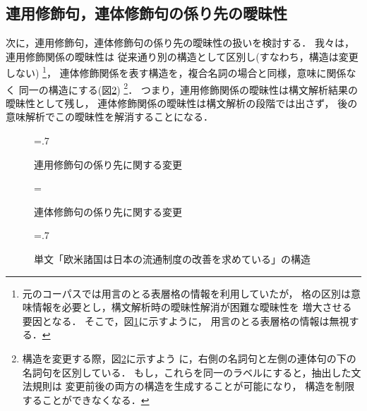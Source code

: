 \subsection{連用修飾句，連体修飾句の係り先の曖昧性}



次に，連用修飾句，連体修飾句の係り先の曖昧性の扱いを検討する．
我々は，連用修飾関係の曖昧性は
従来通り別の構造として区別し(すなわち，構造は変更しない)
\footnote{元のコーパスでは用言のとる表層格の情報を利用していたが，
格の区別は意味情報を必要とし，構文解析時の曖昧性解消が困難な曖昧性を
増大させる要因となる．
そこで，図\ref{fig:convert_adv_phrase}に示すように，
用言のとる表層格の情報は無視する\cite{noro:2003}．}，
連体修飾関係を表す構造を，複合名詞の場合と同様，意味に関係なく
同一の構造にする(図\ref{fig:convert_adn_phrase})
\footnote{構造を変更する際，図\ref{fig:convert_adn_phrase}に示すよう
  に，右側の名詞句と左側の連体句の下の名詞句を区別している．
もし，これらを同一のラベルにすると，抽出した文法規則は
変更前後の両方の構造を生成することが可能になり，
構造を制限することができなくなる．}．
つまり，連用修飾関係の曖昧性は構文解析結果の曖昧性として残し，
連体修飾関係の曖昧性は構文解析の段階では出さず，
後の意味解析でこの曖昧性を解消することになる．

\begin{figure}[tp]
  \centering
  \epsfxsize=.7\textwidth
  \caption{連用修飾句の係り先に関する変更}
  \label{fig:convert_adv_phrase}
\end{figure}

\begin{figure}[tp]
  \centering
  \epsfxsize=\textwidth
  \caption{連体修飾句の係り先に関する変更}
  \label{fig:convert_adn_phrase}
\end{figure}

\begin{figure}[tp]
  \centering
  \epsfxsize=.7\textwidth
  \caption{単文「欧米諸国は日本の流通制度の改善を求めている」の構造}
  \label{fig:structure}
\end{figure}

